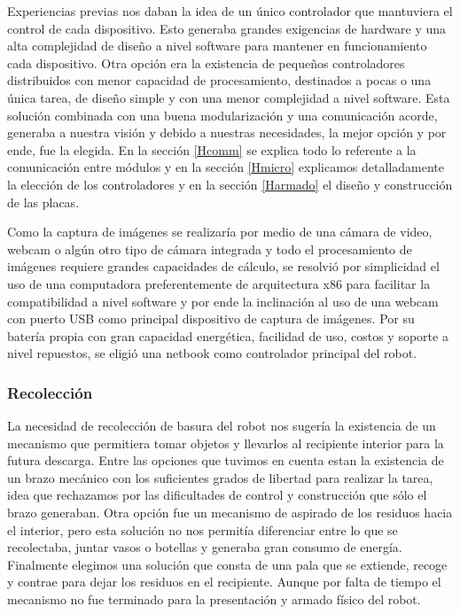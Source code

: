 Experiencias previas nos daban la idea de un \'unico controlador que mantuviera el control de cada dispositivo. Esto generaba grandes exigencias de hardware y
una alta complejidad de dise\~no a nivel software para mantener en funcionamiento cada dispositivo. Otra opci\'on era la existencia de peque\~nos
controladores distribuidos con menor capacidad de procesamiento, destinados a pocas o una \'unica tarea, de dise\~no simple y con una menor complejidad
a nivel software. Esta soluci\'on combinada con una buena modularizaci\'on y una comunicaci\'on acorde, generaba a nuestra visi\'on y debido a
nuestras necesidades, la mejor opci\'on y por ende, fue la elegida.
En la secci\'on \ref{Hcomm} se explica todo lo referente a la comunicaci\'on entre m\'odulos y en la secci\'on \ref{Hmicro} explicamos detalladamente
la elecci\'on de los controladores y en la secci\'on \ref{Harmado} el dise\~no y construcci\'on de las placas.

Como la captura de im\'agenes se realizar\'ia por medio de una c\'amara de video, webcam o alg\'un otro tipo de c\'amara integrada y todo el
procesamiento de im\'agenes requiere grandes capacidades de c\'alculo, se resolvi\'o por simplicidad el uso de una computadora preferentemente de
arquitectura x86 para facilitar la compatibilidad a nivel software y por ende la inclinaci\'on al uso de una webcam con puerto USB como principal
dispositivo de captura de im\'agenes.
Por su bater\'ia propia con gran capacidad energ\'etica, facilidad de uso, costos y soporte a nivel repuestos, se eligi\'o una netbook como
controlador principal del robot.

\subsubsection{Recolecci\'on}

La necesidad de recolecci\'on de basura del robot nos suger\'ia la existencia de un mecanismo que permitiera tomar objetos y llevarlos al recipiente
interior para la futura descarga. Entre las opciones que tuvimos en cuenta estan la existencia de un brazo mec\'anico con los suficientes grados de
libertad para realizar la tarea, idea que rechazamos por las dificultades de control y construcci\'on que sólo el brazo generaban. Otra opci\'on fue
un mecanismo de aspirado de los residuos hacia el interior, pero esta soluci\'on no nos permit\'ia diferenciar entre lo que se recolectaba, juntar
vasos o botellas y generaba gran consumo de energ\'ia. Finalmente elegimos una soluci\'on que consta de una pala que se extiende, recoge y contrae
para dejar los residuos en el recipiente. Aunque por falta de tiempo el mecanismo no fue terminado para la presentaci\'on y armado f\'isico del robot.

